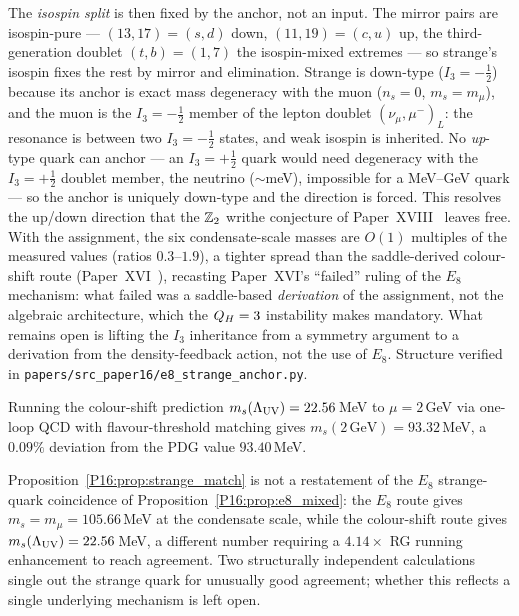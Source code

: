 \begin{remark}
The \emph{isospin split} is then fixed by the anchor, not an input. The
mirror pairs are isospin-pure --- $(13,17)=(s,d)$ down, $(11,19)=(c,u)$ up,
the third-generation doublet $(t,b)=(1,7)$ the isospin-mixed extremes --- so
strange's isospin fixes the rest by mirror and elimination. Strange is
down-type ($I_3=-\tfrac12$) because its anchor is exact mass degeneracy with
the muon ($n_s=0$, $m_s=m_\mu$), and the muon is the $I_3=-\tfrac12$ member
of the lepton doublet $(\nu_\mu,\mu^-)_L$: the resonance is between two
$I_3=-\tfrac12$ states, and weak isospin is inherited. No \emph{up}-type
quark can anchor --- an $I_3=+\tfrac12$ quark would need degeneracy with the
$I_3=+\tfrac12$ doublet member, the neutrino ($\sim$meV), impossible for a
MeV--GeV quark --- so the anchor is uniquely down-type and the direction is
forced. This resolves the up/down direction that the $\mathbb{Z}_2$ writhe
conjecture of Paper~XVIII~\cite{Paper18} leaves free. With the assignment,
the six condensate-scale masses are $O(1)$ multiples of the measured values
(ratios $0.3$--$1.9$), a tighter spread than the saddle-derived colour-shift
route (Paper~XVI~\cite{Paper16}), recasting Paper~XVI's ``failed'' ruling of
the $E_8$ mechanism: what failed was a saddle-based \emph{derivation} of the
assignment, not the algebraic architecture, which the $Q_H=3$ instability
makes mandatory. What remains open is lifting the $I_3$ inheritance from a
symmetry argument to a derivation from the density-feedback action, not the
use of $E_8$. Structure verified in
\texttt{papers/src\_paper16/e8\_strange\_anchor.py}.
\end{remark}

\begin{proposition}
\label{P16:prop:strange_match}
Running the colour-shift prediction $m_s(\Lambda_{\mathrm{UV}})=22.56$\,MeV to
$\mu=2$\,GeV via one-loop QCD with flavour-threshold matching gives
$m_s(2\,\mathrm{GeV})=93.32$\,MeV, a $0.09\%$ deviation from the PDG
value $93.40$\,MeV.
\end{proposition}

\begin{remark}
\label{P16:rem:two_strange_results}
Proposition~\ref{P16:prop:strange_match} is not a restatement of the $E_8$
strange-quark coincidence of Proposition~\ref{P16:prop:e8_mixed}: the $E_8$
route gives $m_s=m_\mu=105.66$\,MeV at the condensate scale, while the
colour-shift route gives $m_s(\Lambda_{\mathrm{UV}})=22.56$\,MeV, a different number
requiring a $4.14\times$ RG running enhancement to reach agreement.
Two structurally independent calculations single out the strange quark
for unusually good agreement; whether this reflects a single underlying
mechanism is left open.
\end{remark}

